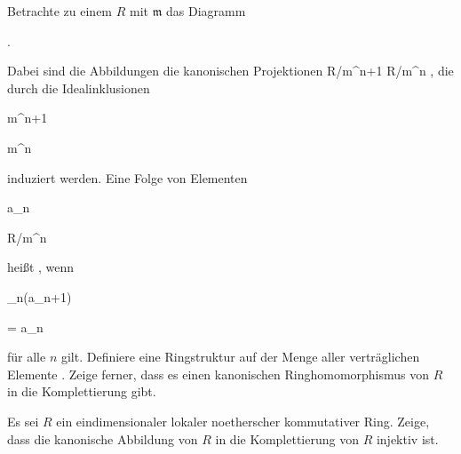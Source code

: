 {


Betrachte zu einem
$R$ mit
${\mathfrak m}$ das Diagramm


 { . }


Dabei sind die Abbildungen die kanonischen Projektionen
 { R/{\mathfrak m}^{n+1} } { R/{\mathfrak m}^n
} {,}
die durch die Idealinklusionen


\mavergleichskette

{\vergleichskette

{ {\mathfrak m}^{n+1}
}

{ \subseteq }{ {\mathfrak m}^n
}

{  }{
}

{    }{
}

{   }{
}

}
{}{}{}
induziert werden. Eine Folge von Elementen


\mavergleichskette

{\vergleichskette

{ a_n
}

{ \in }{ R/{\mathfrak m}^n
}

{  }{
}

{    }{
}

{   }{
}

}
{}{}{}
heißt  {,} wenn


\mavergleichskette

{\vergleichskette

{ \varphi_n(a_{n+1})
}

{ = }{ a_n
}

{  }{
}

{    }{
}

{   }{
}

}
{}{}{}
für alle $n$ gilt. Definiere eine Ringstruktur auf der Menge aller verträglichen Elemente
 {} {.}
Zeige ferner, dass es einen kanonischen Ringhomomorphismus von $R$ in die Komplettierung gibt.


}

{} {}



{}

{


Es sei $R$ ein eindimensionaler lokaler noetherscher kommutativer Ring. Zeige, dass die kanonische Abbildung von $R$ in die Komplettierung von $R$ injektiv ist.


}

